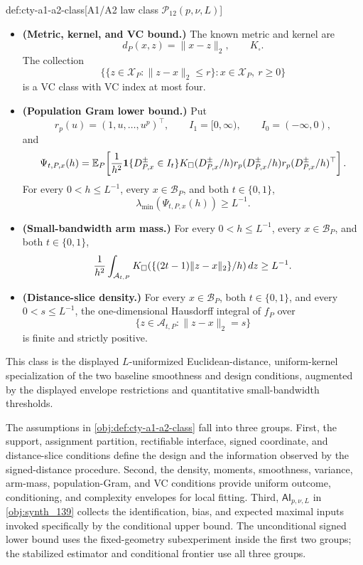 \documentclass[11pt]{article}
\begin{document}
\begin{definitionv}{def:cty-a1-a2-class}[A1/A2 law class \(\mathcal P_{12}(p,\nu,L)\)]
\begin{itemize}
\item \textbf{(Metric, kernel, and VC bound.)} The known metric and kernel are
\[
d_P(x,z)=\lVert x-z\rVert_2,
\qquad
K_\square.
\]
The collection
\[
\{\{z\in\mathcal X_P:\lVert z-x\rVert_2\leq r\}:x\in\mathcal X_P,\ r\geq0\}
\]
is a VC class with VC index at most four.

\item \textbf{(Population Gram lower bound.)} Put
\[
r_p(u)=(1,u,\ldots,u^p)^\top,
\qquad
I_1=[0,\infty),
\qquad
I_0=(-\infty,0),
\]
and
\[
\Psi_{t,P,x}(h)
=
\mathbb E_P\!\left[
{1\over h^2}\mathbf 1\{D^{\pm}_{P,x}\in I_t\}
K_\square(D^{\pm}_{P,x}/h)
r_p(D^{\pm}_{P,x}/h)r_p(D^{\pm}_{P,x}/h)^\top
\right].
\]
For every \(0<h\leq L^{-1}\), every \(x\in\mathcal B_P\), and both \(t\in\{0,1\}\),
\[
\lambda_{\min}(\Psi_{t,P,x}(h))\geq L^{-1}.
\]

\item \textbf{(Small-bandwidth arm mass.)} For every \(0<h\leq L^{-1}\), every \(x\in\mathcal B_P\), and both \(t\in\{0,1\}\),
\[
{1\over h^2}\int_{\mathcal A_{t,P}}
K_\square(\{(2t-1)\lVert z-x\rVert_2\}/h)\,dz
\geq L^{-1}.
\]

\item \textbf{(Distance-slice density.)} For every \(x\in\mathcal B_P\), both \(t\in\{0,1\}\), and every \(0<s\leq L^{-1}\), the one-dimensional Hausdorff integral of \(f_P\) over
\[
\{z\in\mathcal A_{t,P}:\lVert z-x\rVert_2=s\}
\]
is finite and strictly positive.
\end{itemize}

This class is the displayed \(L\)-uniformized Euclidean-distance, uniform-kernel specialization of the two baseline smoothness and design conditions, augmented by the displayed envelope restrictions and quantitative small-bandwidth thresholds.
\end{definitionv}

The assumptions in \cref{obj:def:cty-a1-a2-class} fall into three groups. First, the support, assignment partition, rectifiable interface, signed coordinate, and distance-slice conditions define the design and the information observed by the signed-distance procedure. Second, the density, moments, smoothness, variance, arm-mass, population-Gram, and VC conditions provide uniform outcome, conditioning, and complexity envelopes for local fitting. Third, \(\mathsf{AI}_{p,\nu,L}\) in \cref{obj:synth_139} collects the identification, bias, and expected maximal inputs invoked specifically by the conditional upper bound. The unconditional signed lower bound uses the fixed-geometry subexperiment inside the first two groups; the stabilized estimator and conditional frontier use all three groups.
\end{document}
